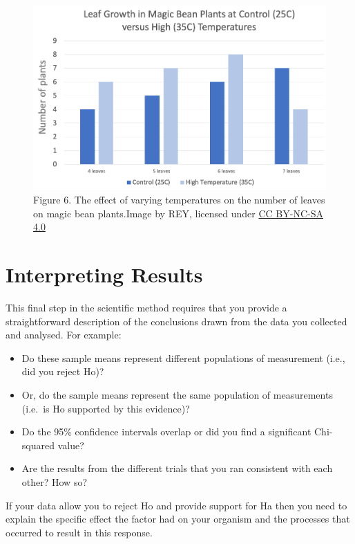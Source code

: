 \documentclass[
]{book}
\providecommand{\tightlist}{%
  \setlength{\itemsep}{0pt}\setlength{\parskip}{0pt}}
\begin{document}
\begin{figure}
\centering
\includegraphics{figures_images/Lab2b-Fig3.png}
\caption{Figure 6. The effect of varying temperatures on the number of leaves on magic bean plants.Image by REY, licensed under \href{https://creativecommons.org/licenses/by-nc-sa/4.0/}{CC BY-NC-SA 4.0}}
\end{figure}

\hypertarget{interpreting-results}{%
\section*{Interpreting Results}\label{interpreting-results}}

This final step in the scientific method requires that you provide a straightforward description of the conclusions drawn from the data you collected and analysed. For example:

\begin{itemize}
\tightlist
\item
  Do these sample means represent different populations of measurement (i.e., did you reject Ho)?
\item
  Or, do the sample means represent the same population of measurements (i.e.~is Ho supported by this evidence)?
\item
  Do the 95\% confidence intervals overlap or did you find a significant Chi-squared value?
\item
  Are the results from the different trials that you ran consistent with each other? How so?
\end{itemize}

If your data allow you to reject Ho and provide support for Ha then you need to explain the specific effect the factor had on your organism and the processes that occurred to result in this response.
\end{document}
